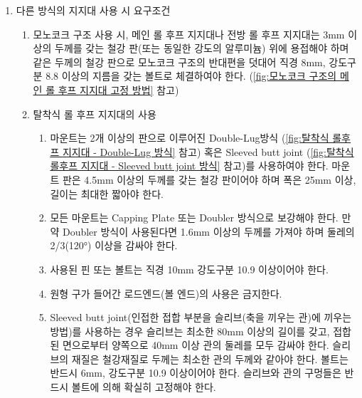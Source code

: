 \documentclass[final,a4paper,10pt]{report}
\begin{document}
\begin{enumerate}
  \item 다른 방식의 지지대 사용 시 요구조건
    \begin{enumerate}
      \item 모노코크 구조 사용 시, 메인 롤 후프 지지대나 전방 롤 후프 지지대는 3mm 이상의 두께를 갖는 철강 판(또는 동일한 강도의 알루미늄) 위에 용접해야 하며 같은 두께의 철강 판으로 모노코크 구조의 반대편을 덧대어 직경 8mm, 강도구분 8.8 이상의 지름을 갖는 볼트로 체결하여야 한다. (\cref{fig:모노코크 구조의 메인 롤 후프 지지대 고정 방법} 참고) \label{item:모노코크 지지대 접합부}
      
      
      \item 탈착식 롤 후프 지지대의 사용
        \begin{enumerate}
            \item 마운트는 2개 이상의 판으로 이루어진 Double-Lug방식 (\cref{fig:탈착식 롤후프 지지대 - Double-Lug 방식} 참고) 혹은 Sleeved butt joint (\cref{fig:탈착식 롤후프 지지대 - Sleeved butt joint 방식} 참고)를 사용하여야 한다. 마운트 판은 4.5mm 이상의 두께를 갖는 철강 판이어야 하며 폭은 25mm 이상, 길이는 최대한 짧아야 한다.
            \item 모든 마운트는 Capping Plate 또는 Doubler 방식으로 보강해야 한다. 만약 Doubler 방식이 사용된다면 1.6mm 이상의 두께를 가져야 하며 둘레의 2/3(120°) 이상을 감싸야 한다.
            \item 사용된 핀 또는 볼트는 직경 10mm 강도구분 10.9 이상이어야 한다.
            \item 원형 구가 들어간 로드엔드(볼 엔드)의 사용은 금지한다.
            \item Sleeved butt joint(인접한 접합 부분을 슬리브(축을 끼우는 관)에 끼우는 방법)를 사용하는 경우 슬리브는 최소한 80mm 이상의 길이를 갖고, 접합된 면으로부터 양쪽으로 40mm 이상 관의 둘레를 모두 감싸야 한다. 슬리브의 재질은 철강재질로 두께는 최소한 관의 두께와 같아야 한다. 볼트는 반드시 6mm, 강도구분 10.9 이상이어야 한다. 슬리브와 관의 구멍들은 반드시 볼트에 의해 확실히 고정해야 한다.
        \end{enumerate}
    \end{enumerate}
\end{enumerate}
\end{document}
